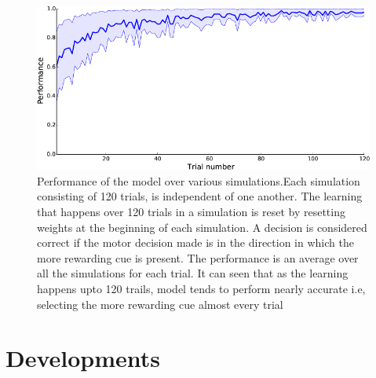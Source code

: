 \documentclass[11pt]{article}
\begin{document}
\begin{figure}[ht]
  \centering
  \includegraphics[width=\textwidth]{figure-2.png}
  \caption[Performance of the model over various simulations]{Performance of the model over various simulations.Each simulation consisting of 120 trials, is independent of one another. The learning that happens over 120 trials in a simulation is reset by resetting weights at the beginning of each simulation. A decision is considered correct if the motor decision made is in the direction in which the more rewarding cue is present. The performance is an average over all the simulations for each trial. It can seen that as the learning happens upto 120 trails, model tends to perform nearly accurate i.e, selecting the more rewarding cue almost every trial}
\end{figure}


\section{Developments}
\end{document}

